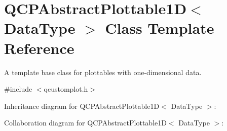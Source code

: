 \hypertarget{classQCPAbstractPlottable1D}{}\section{Q\+C\+P\+Abstract\+Plottable1D$<$ Data\+Type $>$ Class Template Reference}
\label{classQCPAbstractPlottable1D}


A template base class for plottables with one-\/dimensional data.  




{\ttfamily \#include $<$qcustomplot.\+h$>$}



Inheritance diagram for Q\+C\+P\+Abstract\+Plottable1D$<$ Data\+Type $>$\+:


Collaboration diagram for Q\+C\+P\+Abstract\+Plottable1D$<$ Data\+Type $>$\+:
